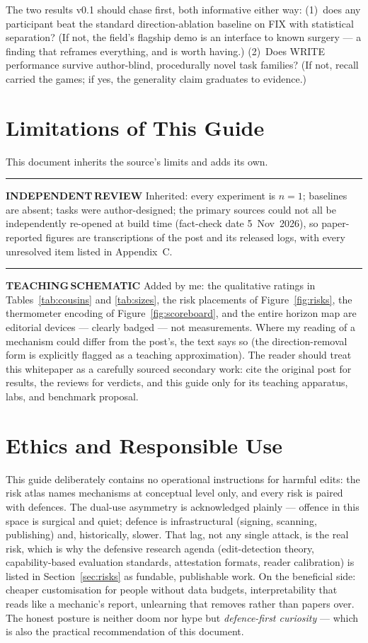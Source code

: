 \documentclass[11pt,a4paper]{article}
\newcommand{\bR}{\textcolor{wspgreen}{\rule[0.12ex]{1.5mm}{1.5mm}}\;\textcolor{wspgreen}{\textbf{INDEPENDENT\,REVIEW}}}
\newcommand{\bS}{\textcolor{wspamber}{\rule[0.12ex]{1.5mm}{1.5mm}}\;\textcolor{wspamber}{\textbf{TEACHING\,SCHEMATIC}}}
\begin{document}
The two results v0.1 should chase first, both informative either way: (1)~does any participant beat the standard direction-ablation baseline on FIX with statistical separation? (If not, the field's flagship demo is an interface to known surgery --- a finding that reframes everything, and is worth having.) (2)~Does WRITE performance survive author-blind, procedurally novel task families? (If not, recall carried the games; if yes, the generality claim graduates to evidence.)

\section{Limitations of This Guide}\label{sec:limitations}

This document inherits the source's limits and adds its own. \bR\; Inherited: every experiment is $n{=}1$; baselines are absent; tasks were author-designed; the primary sources could not all be independently re-opened at build time (fact-check date 5~Nov~2026), so paper-reported figures are transcriptions of the post and its released logs, with every unresolved item listed in Appendix~C. \bS\; Added by me: the qualitative ratings in Tables~\ref{tab:cousins} and \ref{tab:sizes}, the risk placements of Figure~\ref{fig:risks}, the thermometer encoding of Figure~\ref{fig:scoreboard}, and the entire horizon map are editorial devices --- clearly badged --- not measurements. Where my reading of a mechanism could differ from the post's, the text says so (the direction-removal form is explicitly flagged as a teaching approximation). The reader should treat this whitepaper as a carefully sourced secondary work: cite the original post for results, the reviews for verdicts, and this guide only for its teaching apparatus, labs, and benchmark proposal.

\section{Ethics and Responsible Use}\label{sec:ethics}

This guide deliberately contains no operational instructions for harmful edits: the risk atlas names mechanisms at conceptual level only, and every risk is paired with defences. The dual-use asymmetry is acknowledged plainly --- offence in this space is surgical and quiet; defence is infrastructural (signing, scanning, publishing) and, historically, slower. That lag, not any single attack, is the real risk, which is why the defensive research agenda (edit-detection theory, capability-based evaluation standards, attestation formats, reader calibration) is listed in Section~\ref{sec:risks} as fundable, publishable work. On the beneficial side: cheaper customisation for people without data budgets, interpretability that reads like a mechanic's report, unlearning that removes rather than papers over. The honest posture is neither doom nor hype but \emph{defence-first curiosity} --- which is also the practical recommendation of this document.
\end{document}
